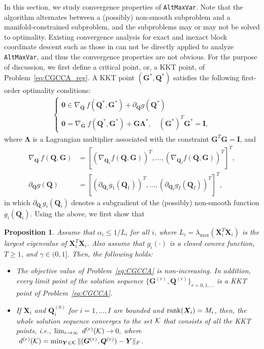 \documentclass[10pt,journal]{IEEEtran}
\newtheorem{Prop}{Proposition}
\newcommand{\G}{\boldsymbol{G}}
\newcommand{\Q}{\boldsymbol{Q}}
\begin{document}
In this section, we study convergence properties of \texttt{AltMaxVar}.
Note that the algorithm alternates between a (possibly) non-smooth subproblem and a manifold-constrained subproblem, and the subproblems may or may not be solved to optimality.
Existing convergence analysis for exact and inexact block coordinate descent such as those in \cite{bertsekas1999nonlinear,razaviyayn2013unified,xu2013block,xu2014globally} can not be directly applied to analyze \texttt{AltMaxVar}, and thus the convergence properties are not obvious.
For the purpose of discussion, we first define a critical point, or, a KKT point, of Problem~\eqref{eq:CGCCA_reg}.
A KKT point $(\G^\ast,\Q^\ast)$ satisfies the following first-order optimality conditions:
\begin{align}\label{eq:KKT}
\begin{cases}
 {\bm 0}\in \nabla_{\Q}~f(\Q^\ast,\G^\ast) + \partial_{\Q} g(\Q^\ast)\\
 {\bm 0}= \nabla_{\G}~f(\Q^\ast,\G^\ast) + \G{\bm \Lambda}^\ast,\quad (\G^\ast)^T\G^\ast = \bm I,
\end{cases}
\end{align}
where ${\bm \Lambda}$
is a Lagrangian multiplier associated with the constraint $\G^T\G={\bm I}$, and
\begin{align*}
\nabla_{\Q}~f(\Q,\G)& =[(\nabla_{\Q_1}f(\Q,\G))^T,\ldots,(\nabla_{\Q_I}f(\Q,\G))^T]^T,\\
\partial_{\Q} g(\Q) &=[( \partial_{\Q_1} g_1(\Q_1))^T,\ldots,(\partial_{\Q_I} g_I(\Q_I))^T]^T,
\end{align*}
in which $\partial_{\Q_i} g_i(\Q_i)$ denotes a subgradient of the (possibly) non-smooth function $g_i(\Q_i)$.
Using the above, we first show that
\begin{Prop}\label{lem:monotonicity}
Assume that $\alpha_i \leq 1/L_i$ for all $i$, where $L_i=\lambda_{\max}({\bm X}_i^T{\bm X}_i)$ is the largest eigenvalue of ${\bm X}_i^T{\bm X}_i$.
Also assume that $g_i(\cdot)$ is a closed convex function, $T\geq 1$, and $\gamma\in(0,1]$. Then, the following holds:
\begin{itemize}
\item[(a)] The objective value of Problem~\eqref{eq:CGCCA} is non-increasing.
In addition, every limit point of the solution sequence $\{{\bm G}^{(r)},{\bm Q}^{(r)}\}_{r=0,1,\ldots}$ is a KKT point of Problem~\eqref{eq:CGCCA}.
\item[(b)] If ${\bm X}_i$ and ${\bm Q}^{(0)}_i$ for $i=1,\ldots,I$ are bounded and ${\rm rank}({\bm X}_i)=M_i$,
then, the whole solution sequence converges to the set ${\cal K}$ that consists of all the KKT points, i.e., $\lim_{r\rightarrow \infty}~d^{(r)}({\cal K})\rightarrow 0,$
where $~d^{(r)}({\cal K})=\min_{{\bm Y}\in{\cal K}}\|({\bm G}^{(r)},{\bm Q}^{(r)})-{\bm Y}\|_F$.
\end{itemize}
\end{Prop}
\end{document}
